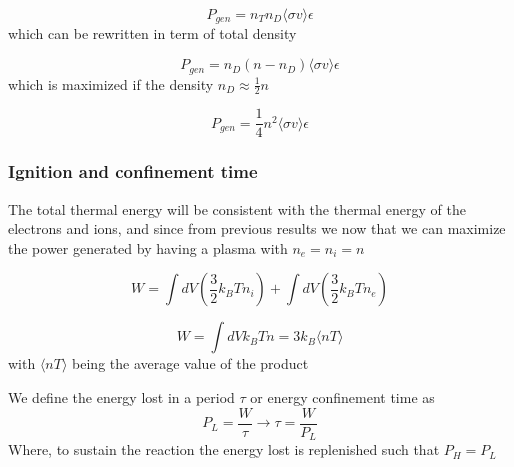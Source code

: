\documentclass[smallextended]{svjour3}
\begin{document}
\begin{equation}
    P_{gen} = n_T n_D \langle \sigma v\rangle \epsilon
\end{equation}
which can be rewritten in term of total density

\begin{equation}
    P_{gen} = n_D(n - n_D) \langle \sigma v\rangle \epsilon
\end{equation}
which is maximized if the density $n_D \approx \frac{1}{2}n$

\begin{equation}
    P_{gen} = \frac{1}{4}n^2 \langle \sigma v\rangle \epsilon
\end{equation}
\subsubsection{Ignition and confinement time}

The total thermal energy will be consistent with the thermal energy of the electrons and ions, and since from previous results we now that we can maximize the power generated by having a plasma with $n_e = n_i = n$

\begin{equation}
    W = \int dV \left(\frac{3}{2}k_B T n_i\right) + \int dV \left(\frac{3}{2}k_B T n_e\right)
\end{equation}

\begin{equation*}
    W = \int dV k_B T n = 3k_B \langle n T \rangle
\end{equation*}
 with $\langle n T \rangle$ being the average value of the product

We define the energy lost in a period $\tau$ or energy confinement time as
\begin{equation}
    P_L = \frac{W}{\tau} \to  \tau = \frac{W}{P_L} 
\end{equation}
Where, to sustain the reaction the energy lost is replenished such that $P_H = P_L$
\end{document}
